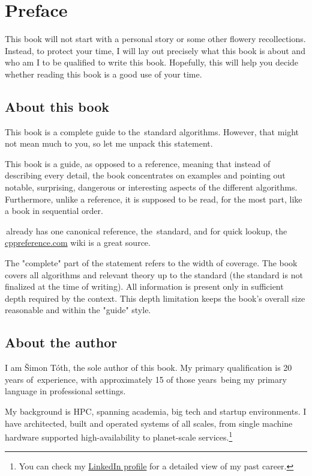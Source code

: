 \chapter{Preface}

This book will not start with a personal story or some other flowery recollections. Instead, to protect your time, I will lay out precisely what this book is about and who am I to be qualified to write this book. Hopefully, this will help you decide whether reading this book is a good use of your time.

\section*{About this book}

This book is a complete guide to the \CC\,standard algorithms. However, that might not mean much to you, so let me unpack this statement.

This book is a guide, as opposed to a reference, meaning that instead of describing every detail, the book concentrates on examples and pointing out notable, surprising, dangerous or interesting aspects of the different algorithms. Furthermore, unlike a reference, it is supposed to be read, for the most part, like a book in sequential order.

\CC\,already has one canonical reference, the \CC\,standard, and for quick lookup, the \href{https://cppreference.com}{cppreference.com} wiki is a great source.

The "complete" part of the statement refers to the width of coverage. The book covers all algorithms and relevant theory up to the  standard (the  standard is not finalized at the time of writing). All information is present only in sufficient depth required by the context. This depth limitation keeps the book's overall size reasonable and within the "guide" style.

\section*{About the author}

I am Šimon Tóth, the sole author of this book. My primary qualification is 20 years of \CC\,experience, with approximately 15 of those years \CC\,being my primary language in professional settings.

My background is HPC, spanning academia, big tech and startup environments. I have architected, built and operated systems of all scales, from single machine hardware supported high-availability to planet-scale services.\footnote{You can check my \href{https://cz.linkedin.com/in/simontoth}{LinkedIn profile} for a detailed view of my past career.}


